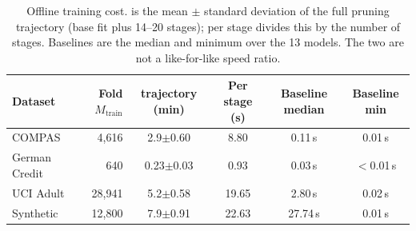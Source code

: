 \begin{table}[!b]
\centering
\caption{Offline training cost. \modelname{} is the mean $\pm$ standard deviation of the full pruning trajectory (base fit plus 14--20 stages); per stage divides this by the number of stages. Baselines are the median and minimum over the 13 models. The two are not a like-for-like speed ratio.}
\label{tab:train_cost}
\setlength{\tabcolsep}{4pt}
\begin{tabular}{l r c c c c}
\toprule
\textbf{Dataset} & \textbf{Fold $M_{\text{train}}$} & \textbf{\modelname{} trajectory (min)} & \textbf{Per stage (s)} & \textbf{Baseline median} & \textbf{Baseline min} \\
\midrule
COMPAS & 4,616 & 2.9$\pm$0.60 & 8.80 & 0.11\,s & 0.01\,s \\
German Credit & 640 & 0.23$\pm$0.03 & 0.93 & 0.03\,s & $<$0.01\,s \\
UCI Adult & 28,941 & 5.2$\pm$0.58 & 19.65 & 2.80\,s & 0.02\,s \\
Synthetic & 12,800 & 7.9$\pm$0.91 & 22.63 & 27.74\,s & 0.01\,s \\
\bottomrule
\end{tabular}
\end{table}
